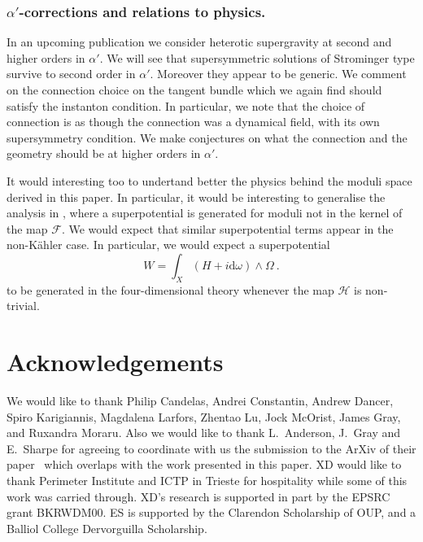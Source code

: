 \documentclass[12pt,a4paper]{article}
\def\a{\alpha'}
\def\d{\textrm{d}}
\def\H{\mathcal{H}}
\def\F{\mathcal{F}}
\def\H{\mathcal{H}}
\theoremstyle{definition}
\begin{document}
\subsubsection*{$\alpha'$-corrections and relations to physics.}
In an upcoming publication \cite{delaossa2014} we consider heterotic supergravity at second and higher orders in $\a$. We will see that supersymmetric solutions of Strominger type survive to second order in $\a$. Moreover they appear to be generic. We comment on the connection choice on the tangent bundle which we again find should satisfy the instanton condition. In particular, we note that the choice of connection is as though the connection was a dynamical field, with its own supersymmetry condition. We make conjectures on what the connection and the geometry should be at higher orders in $\a$. 

It would interesting too to undertand better the physics behind the moduli space derived in this paper. In particular, it would be interesting to
generalise the analysis in \cite{Anderson:2010mh}, where a superpotential is generated for moduli not in the kernel of the map $\F$. We would expect that similar superpotential terms appear in the non-K\"ahler case. In particular, we would expect a  superpotential~\citep{LopesCardoso:2003af, Becker:2003yv, Becker:2003gq}
\begin{equation*}
W=\int_X(H+i\d\omega)\wedge\Omega\:.
\end{equation*}
to be generated in the four-dimensional theory whenever the map $\H$ is non-trivial. 



\section{Acknowledgements}
We would like to thank Philip Candelas, Andrei Constantin, Andrew Dancer, Spiro Karigiannis, Magdalena Larfors,  Zhentao Lu, Jock McOrist, James Gray, and Ruxandra Moraru.  Also we would like to thank L.~Anderson, J.~Gray and E.~Sharpe for agreeing to coordinate with us the submission to the ArXiv of their paper~\citep{Anderson:2014xha} which overlaps with the work  presented in this paper.
XD would like to thank Perimeter Institute and ICTP in Trieste for hospitality while some of this work was carried through.  
XD's research is supported in part by the EPSRC grant BKRWDM00. 
ES is supported by the Clarendon Scholarship of OUP, and a Balliol College Dervorguilla Scholarship. 

\newpage
\appendix
\end{document}
